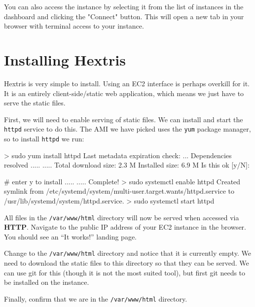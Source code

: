\documentclass{csse4400}
\begin{document}
\vspace{5mm}
\noindent
You can also access the instance by selecting it from the list of instances in the dashboard and clicking the "Connect" button.
This will open a new tab in your browser with terminal access to your instance.


\section{Installing Hextris}\label{sec:installHextris}
Hextris \cite{hextris} is very simple to install. Using an EC2 interface is perhaps overkill for it.
It is an entirely client-side/static web application, which means we just have to serve the static files.

First, we will need to enable serving of static files.
We can install and start the \texttt{httpd} service to do this.
The AMI we have picked uses the \texttt{yum} package manager, so to install \texttt{httpd} we run:

\begin{code}[language=bash,numbers=none]{}
> sudo yum install httpd
Last metadata expiration check: ...
Dependencies resolved
..... 
..... 
Total download size: 2.3 M
Installed size: 6.9 M
Is this ok [y/N]:

# enter y to install
..... 
..... 
Complete!
> sudo systemctl enable httpd
Created symlink from /etc/systemd/system/multi-user.target.wants/httpd.service to /usr/lib/systemd/system/httpd.service.
> sudo systemctl start httpd
\end{code}

All files in the \texttt{/var/www/html} directory will now be served when accessed via \textbf{HTTP}.
Navigate to the public IP address of your EC2 instance in the browser.
You should see an ``It works!'' landing page.

Change to the \texttt{/var/www/html} directory and notice that it is currently empty.
We need to download the static files to this directory so that they can be served.
We can use git for this (though it is not the most suited tool),
but first git needs to be installed on the instance.


Finally, confirm that we are in the \texttt{/var/www/html} directory.


\end{document}
